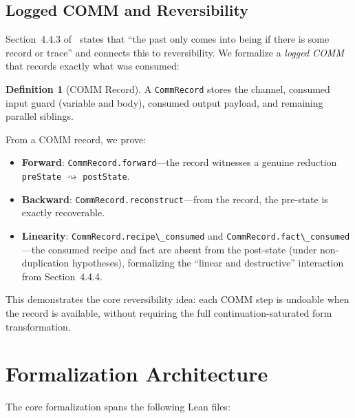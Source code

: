 \documentclass[11pt,a4paper]{article}
\theoremstyle{definition}
\newtheorem{definition}[theorem]{Definition}
\theoremstyle{remark}
\newcommand{\reduces}{\rightsquigarrow}
\newcommand{\lean}[1]{\lstinline[language=Lean4]{#1}}
\begin{document}
\subsection{Logged COMM and Reversibility}
\label{sec:logged}

Section~4.4.3 of~\cite{meredith2026spice} states that ``the past only comes into
being if there is some record or trace'' and connects this to reversibility.
We formalize a \emph{logged COMM} that records exactly what was consumed:

\begin{definition}[COMM Record]
A \lean{CommRecord} stores the channel, consumed input guard (variable and body),
consumed output payload, and remaining parallel siblings.
\end{definition}

From a COMM record, we prove:
\begin{itemize}[nosep]
  \item \textbf{Forward}: \lean{CommRecord.forward}---the record witnesses
    a genuine reduction \lean{preState} $\reduces$ \lean{postState}.
  \item \textbf{Backward}: \lean{CommRecord.reconstruct}---from the record,
    the pre-state is exactly recoverable.
  \item \textbf{Linearity}: \lean{CommRecord.recipe\_consumed} and
    \lean{CommRecord.fact\_consumed}---the consumed recipe and fact are
    absent from the post-state (under non-duplication hypotheses),
    formalizing the ``linear and destructive'' interaction from Section~4.4.4.
\end{itemize}

This demonstrates the core reversibility idea: each COMM step is undoable
when the record is available, without requiring the full continuation-saturated
form transformation.

\section{Formalization Architecture}
\label{sec:architecture}

The core formalization spans the following Lean files:
\end{document}
